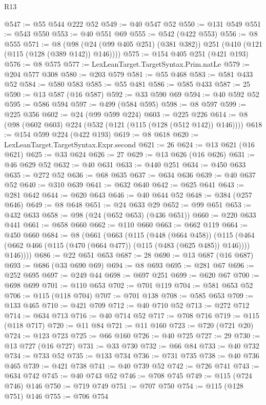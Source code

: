 \begin{lexlean}{R13}
\begin{coremodule}
@547 := @55 @544 @222 @52
@549 := @40 @547 @52
@550 := @131 @549
@551 := @543 @550
@553 := @40 @551 @69
@555 := @542 (@422 @553)
@556 := @8 @555
@571 := @8 (@98 (@24 (@99 @405 @251) (@381 @382)) @251 (@410 (@121 (@115 (@128 (@389 @142)) @146))))
@575 := @154 @405 @251 (@421 @193)
@576 := @8 @575
@577 := LexLeanTarget.TargetSyntax.Prim.natLe
@579 := @204 @577 @308
@580 := @203 @579
@581 := @55 @468
@583 := @581 @433 @52
@584 := @580 @583
@585 := @55 @481
@586 := @585 @433
@587 := 25
@590 := @13 @587 (@16 @587)
@592 := @33 @590 @69
@594 := @40 @592 @52
@595 := @586 @594
@597 := @499 (@584 @595)
@598 := @8 @597
@599 := @225 @356
@602 := @24 (@99 @599 @224)
@603 := @225 @226
@614 := @8 (@98 (@602 @603) @224 (@532 (@121 (@115 (@128 (@512 @142)) @146))))
@618 := @154 @599 @224 (@422 @193)
@619 := @8 @618
@620 := LexLeanTarget.TargetSyntax.Expr.second
@621 := 26
@624 := @13 @621 (@16 @621)
@625 := @33 @624
@626 := 27
@629 := @13 @626 (@16 @626)
@631 := @46 @629 @52
@632 := @40 @631
@633 := @440 @251
@634 := @450 @633
@635 := @272 @52
@636 := @68 @635
@637 := @634 @636
@639 := @40 @637 @52
@640 := @310 @639
@641 := @632 @640
@642 := @625 @641
@643 := @281 @642
@644 := @620 @643
@646 := @40 @644 @52
@648 := @384 (@257 @646)
@649 := @8 @648
@651 := @24 @633 @29
@652 := @99 @651
@653 := @432 @633
@658 := @98 (@24 (@652 @653) (@436 @651))
@660 := @220 @633 @441
@661 := @658 @660
@662 := @110 @660
@663 := @662 @119
@664 := @450 @660
@684 := @8
    (@661
      (@663
        (@115
          (@448 (@664 @458))
          (@115 (@464 (@662 @466 (@115 (@470 (@664 @477)) (@115 (@483 (@625 @485)) @146)))) @146))))
@686 := @22 @651 @653
@687 := 28
@690 := @13 @687 (@16 @687)
@693 := @686 (@33 @690 @69)
@694 := @8 @693
@695 := @281 @67
@696 := @252 @695
@697 := @249 @44
@698 := @697 @251
@699 := @620 @67
@700 := @698 @699
@701 := @110 @653
@702 := @701 @119
@704 := @581 @653 @52
@706 := @115 (@118 @704)
@707 := @701 @138
@708 := @585 @653
@709 := @133 @465
@710 := @421 @709
@712 := @40 @710 @52
@713 := @272 @712
@714 := @634 @713
@716 := @40 @714 @52
@717 := @708 @716
@719 := @115 (@118 @717)
@720 := @11 @84
@721 := @11 @160
@723 := @720 (@721 @20)
@724 := @123 @723
@725 := @66 @160
@726 := @40 @725
@727 := 29
@730 := @13 @727 (@16 @727)
@731 := @33 @730
@732 := @66 @84
@733 := @40 @732
@734 := @733 @52
@735 := @133 @734
@736 := @731 @735
@738 := @40 @736 @465
@739 := @421 @738
@741 := @40 @739 @52
@742 := @726 @741
@743 := @634 @742
@745 := @40 @743 @52
@746 := @708 @745
@749 := @115 (@724 @746) @146
@750 := @719 @749
@751 := @707 @750
@754 := @115 (@128 @751) @146
@755 := @706 @754

\end{coremodule}
\end{lexlean}
